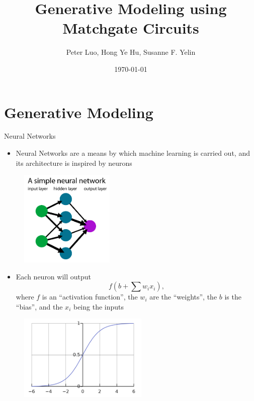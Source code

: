 \documentclass[xcolor=dvipsnames]{beamer}
\title[Modeling using Matchgates]{Generative Modeling using Matchgate Circuits}
\author{Peter Luo, Hong Ye Hu, Susanne F. Yelin}
\date{\today}
\begin{document}
\frame{\titlepage}

\section{Generative Modeling}

\begin{frame}{Neural Networks}

  \begin{itemize}
    \item Neural Networks are a means by which machine learning is carried out, and its architecture is inspired by neurons
  \end{itemize}
  \begin{figure}
    \centering
    \includegraphics[width=0.4\textwidth]{NN.png}
  \end{figure}

\end{frame}

\begin{frame}{}
  \begin{itemize}
    \item Each neuron will output 
    $$f\left(b+\sum w_ix_i\right),$$
    where $f$ is an ``activation function'', the $w_i$ are the ``weights'', the $b$ is the ``bias'', and the $x_i$ being the inputs
  \end{itemize}
  \begin{figure}
    \centering
    \includegraphics[width=0.55\textwidth]{sigmoid.png}
  \end{figure}

\end{frame}
\end{document}
